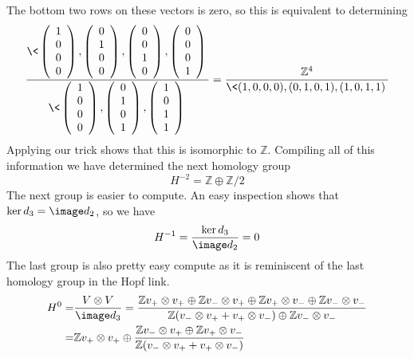 The bottom two rows on these vectors is zero, so this is equivalent to determining
\[ \frac{ \< \left( \begin{array}{r} 1\\0\\0\\0 \end{array} \right),
             \left( \begin{array}{r} 0\\1\\0\\0 \end{array} \right),
             \left( \begin{array}{r} 0\\0\\1\\0 \end{array} \right),
             \left( \begin{array}{r} 0\\0\\0\\1 \end{array} \right)
           \>}{ \< 
             \left( \begin{array}{r} 1\\0\\0\\0 \end{array} \right), 
             \left( \begin{array}{r} 0\\1\\0\\1 \end{array} \right), 
             \left( \begin{array}{r} 1\\0\\1\\1 \end{array} \right) 
\> }
= \frac{\mathbb Z^4}{ \< (1,0,0,0),(0,1,0,1),(1,0,1,1) \> }
\]
Applying our trick shows that this is isomorphic to $\mathbb Z$. Compiling all of this information we have determined the next homology group
\[ H^{-2} = \mathbb Z \oplus \mathbb Z/2 \]
The next group is easier to compute. An easy inspection shows that $\ker d_3 = \image d_2$, so we have
\[ H^{-1} = \frac{\ker d_3}{\image d_2} = 0 \]
The last group is also pretty easy compute as it is reminiscent of the last homology group in the Hopf link.
\begin{align*}
H^0    =& \frac{V \otimes V}{\image d_3} = \frac{\mathbb Z v_+ \otimes v_+ \oplus \mathbb Z v_- \otimes v_+ \oplus \mathbb Z v_+ \otimes v_- \oplus \mathbb Z v_- \otimes v_-}{\mathbb Z (v_- \otimes v_+ + v_+ \otimes v_-) \oplus \mathbb Z v_- \otimes v_-} \\
       =& \mathbb Z v_+ \otimes v_+ \oplus \frac{\mathbb Z v_- \otimes v_+ \oplus \mathbb Z v_+ \otimes v_-}{\mathbb Z (v_- \otimes v_+ + v_+ \otimes v_-)}
\end{align*}
